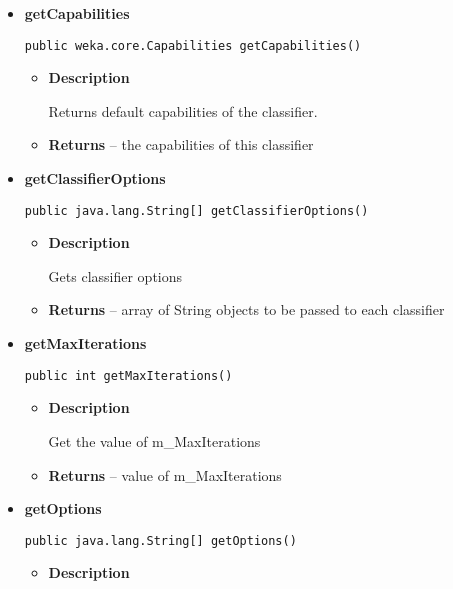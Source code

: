 \documentclass[11pt,a4paper]{report}
\begin{document}
{{{{{\begin{itemize}
{\begin{itemize}
{Method called when iteration has terminated. Imputes class values if m\_Supervised is set.
}
\end{itemize}
}%
\item{ 
{\bf  getCapabilities}\\
\begin{lstlisting}[frame=none]
public weka.core.Capabilities getCapabilities()\end{lstlisting} %
\begin{itemize}
\item{
{\bf  Description}

Returns default capabilities of the classifier.
}
\item{{\bf  Returns} -- 
the capabilities of this classifier 
}%
\end{itemize}
}%
\item{ 
{\bf  getClassifierOptions}\\
\begin{lstlisting}[frame=none]
public java.lang.String[] getClassifierOptions()\end{lstlisting} %
\begin{itemize}
\item{
{\bf  Description}

Gets classifier options
}
\item{{\bf  Returns} -- 
array of String objects to be passed to each classifier 
}%
\end{itemize}
}%
\item{ 
{\bf  getMaxIterations}\\
\begin{lstlisting}[frame=none]
public int getMaxIterations()\end{lstlisting} %
\begin{itemize}
\item{
{\bf  Description}

Get the value of m\_MaxIterations
}
\item{{\bf  Returns} -- 
value of m\_MaxIterations 
}%
\end{itemize}
}%
\item{ 
{\bf  getOptions}\\
\begin{lstlisting}[frame=none]
public java.lang.String[] getOptions()\end{lstlisting} %
\begin{itemize}
\item{
{\bf  Description}

}
\end{itemize}}
\end{itemize}}}}}}
\end{document}
